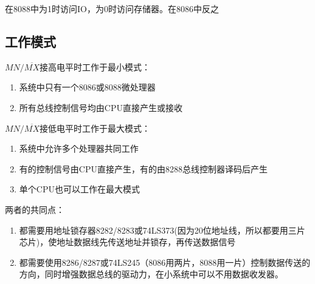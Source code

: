 在8088中为1时访问IO，为0时访问存储器。在8086中反之
\subsection{工作模式}
$MN/\overline{MX}$接高电平时工作于最小模式：
\begin{enumerate}
    \item 系统中只有一个8086或8088微处理器
    \item 所有总线控制信号均由CPU直接产生或接收
\end{enumerate}
$MN/\overline{MX}$接低电平时工作于最大模式：
\begin{enumerate}
    \item 系统中允许多个处理器共同工作
    \item 有的控制信号由CPU直接产生，有的由8288总线控制器译码后产生
    \item 单个CPU也可以工作在最大模式
\end{enumerate}
两者的共同点：
\begin{enumerate}
    \item 都需要用地址锁存器8282/8283或74LS373(因为20位地址线，所以都要用三片芯片)，使地址数据线先传送地址并锁存，再传送数据信号
    \item 都需要使用8286/8287或74LS245（8086用两片，8088用一片）控制数据传送的方向，同时增强数据总线的驱动力，在小系统中可以不用数据收发器。
\end{enumerate}
